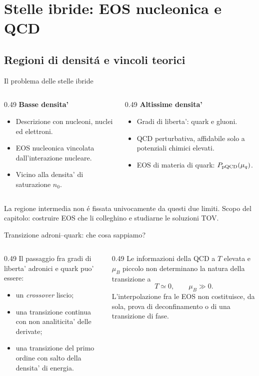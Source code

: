 \section{Stelle ibride: EOS nucleonica e QCD}

\subsection{Regioni di densit\'a e vincoli teorici}

\begin{frame}{Il problema delle stelle ibride}
\small
\begin{columns}[T,onlytextwidth]
\begin{column}{0.49\textwidth}
\textbf{Basse densita'}
\begin{itemize}
\item Descrizione con nucleoni, nuclei ed elettroni.
\item EOS nucleonica vincolata dall'interazione nucleare.
\item Vicino alla densita' di saturazione $n_0$.
\end{itemize}
\end{column}
\begin{column}{0.49\textwidth}
\textbf{Altissime densita'}
\begin{itemize}
\item Gradi di liberta': quark e gluoni.
\item QCD perturbativa, affidabile solo a potenziali chimici elevati.
\item EOS di materia di quark: $P_{\rm pQCD}(\mu_q)$.
\end{itemize}
\end{column}
\end{columns}
\medskip
La regione intermedia non \'e fissata univocamente da questi due limiti.
\medskip
Scopo del capitolo: costruire EOS che li colleghino e studiarne le soluzioni TOV.
\end{frame}

\begin{frame}{Transizione adroni--quark: che cosa sappiamo?}
\small
\begin{columns}[T,onlytextwidth]
\begin{column}{0.49\textwidth}
Il passaggio fra gradi di liberta' adronici e quark puo' essere:
\begin{itemize}
\item un \emph{crossover} liscio;
\item una transizione continua con non analiticita' delle derivate;
\item una transizione del primo ordine con salto della densita' di energia.
\end{itemize}
\end{column}
\begin{column}{0.49\textwidth}
Le informazioni della QCD a $T$ elevata e $\mu_B$ piccolo non determinano la natura della transizione a
\[
T\simeq0,\qquad \mu_B\gg0.
\]
L'interpolazione fra le EOS non costituisce, da sola, prova di deconfinamento o di una transizione di fase.
\end{column}
\end{columns}
\end{frame}

